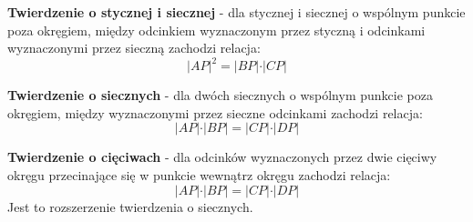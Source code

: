 \documentclass[14pt,a4paper]{extarticle}
\begin{document}
\noindent \textbf{Twierdzenie o stycznej i siecznej} - dla stycznej i siecznej o wspólnym punkcie
poza okręgiem, między odcinkiem wyznaczonym przez styczną i odcinkami wyznaczonymi przez sieczną
zachodzi relacja:
$$\vert AP\vert^{2}=\vert BP\vert\cdot\vert CP\vert$$
\MoveBelowBox
\hfill\break


\noindent \textbf{Twierdzenie o siecznych} - dla dwóch siecznych o wspólnym punkcie poza okręgiem,
między wyznaczonymi przez sieczne odcinkami zachodzi relacja:
$$\vert AP\vert\cdot\vert BP\vert = \vert CP\vert\cdot\vert DP\vert$$
\MoveBelowBox
\hfill\break


\noindent \textbf{Twierdzenie o cięciwach} - dla odcinków wyznaczonych przez dwie cięciwy okręgu przecinające
się w punkcie wewnątrz okręgu zachodzi relacja:
$$\vert AP\vert\cdot\vert BP\vert = \vert CP\vert\cdot\vert DP\vert$$
Jest to rozszerzenie twierdzenia o siecznych.
\MoveBelowBox
\end{document}
